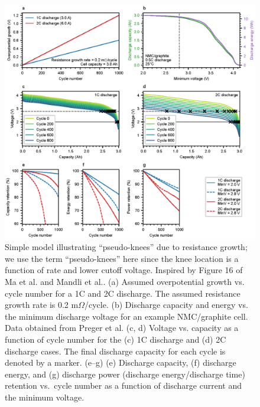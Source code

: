 \documentclass[journal=jpclcd,manuscript=article]{achemso}
\begin{document}
\begin{figure}[p]
\centering
\includegraphics[scale = 1]{figures/resistance_growth_knee_2.eps}
\caption{Simple model illustrating ``pseudo-knees'' due to resistance growth; we use the term ``pseudo-knees'' here since the knee location is a function of rate and lower cutoff voltage. Inspired by Figure 16 of Ma et al.\cite{ma_editors_2019} and Mandli et al.\cite{mandli_analysis_2019}. (a) Assumed overpotential growth vs. cycle number for a 1C and 2C discharge. The assumed resistance growth rate is 0.2 m$\Omega$/cycle. (b) Discharge capacity and energy vs. the minimum discharge voltage for an example NMC/graphite cell. Data obtained from Preger et al.\cite{preger_degradation_2020} (c, d) Voltage vs. capacity as a function of cycle number for the (c) 1C discharge and (d) 2C discharge cases. The final discharge capacity for each cycle is denoted by a marker. (e--g) (e) Discharge capacity, (f) discharge energy, and (g) discharge power (discharge energy/discharge time) retention vs.\ cycle number as a function of discharge current and the minimum voltage.
}
\label{fig:dcr_knee}
\end{figure}
\end{document}
